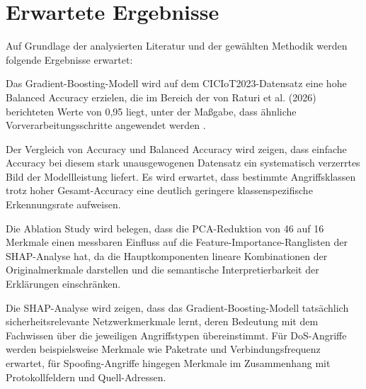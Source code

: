\section{Erwartete Ergebnisse}\label{erwartete_ergebnisse}

Auf Grundlage der analysierten Literatur und der gewählten Methodik werden folgende Ergebnisse erwartet:

Das Gradient-Boosting-Modell wird auf dem CICIoT2023-Datensatz eine hohe Balanced Accuracy erzielen, die im Bereich der von Raturi et al. (2026) berichteten Werte von 0,95 liegt, unter der Maßgabe, dass ähnliche Vorverarbeitungsschritte angewendet werden \cite{raturi2026exploratory}.

Der Vergleich von Accuracy und Balanced Accuracy wird zeigen, dass einfache Accuracy bei diesem stark unausgewogenen Datensatz ein systematisch verzerrtes Bild der Modellleistung liefert. Es wird erwartet, dass bestimmte Angriffsklassen trotz hoher Gesamt-Accuracy eine deutlich geringere klassenspezifische Erkennungsrate aufweisen.

Die Ablation Study wird belegen, dass die PCA-Reduktion von 46 auf 16 Merkmale einen messbaren Einfluss auf die Feature-Importance-Ranglisten der SHAP-Analyse hat, da die Hauptkomponenten lineare Kombinationen der Originalmerkmale darstellen und die semantische Interpretierbarkeit der Erklärungen einschränken.

Die SHAP-Analyse wird zeigen, dass das Gradient-Boosting-Modell tatsächlich sicherheitsrelevante Netzwerkmerkmale lernt, deren Bedeutung mit dem Fachwissen über die jeweiligen Angriffstypen übereinstimmt. Für DoS-Angriffe werden beispielsweise Merkmale wie Paketrate und Verbindungsfrequenz erwartet, für Spoofing-Angriffe hingegen Merkmale im Zusammenhang mit Protokollfeldern und Quell-Adressen.
